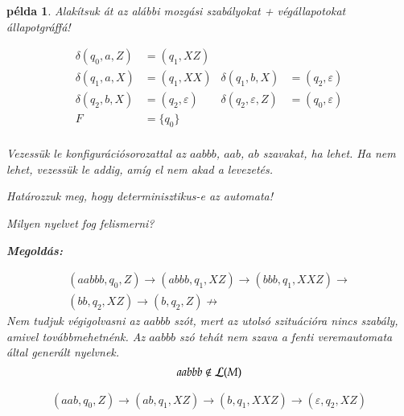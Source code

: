 \documentclass[a4paper]{article}
\newtheorem{pelda}{példa}[section]
\begin{document}
\begin{pelda}
Alakítsuk át az alábbi mozgási szabályokat + végállapotokat állapotgráffá!

\begin{align*}
\delta(q_0, a, Z) &= (q_1, XZ)\\
\delta(q_1, a, X) &= (q_1, XX)&
\delta(q_1, b, X) &= (q_2, \varepsilon)\\
\delta(q_2, b, X) &= (q_2, \varepsilon)&
\delta(q_2, \varepsilon, Z) &= (q_0, \varepsilon)\\
F &= \{q_0\}&&\\
\end{align*}

Vezessük le konfigurációsorozattal az $aabbb$, 
$aab$, $ab$ szavakat, ha lehet. Ha nem lehet, vezessük le addig, amíg el
nem akad a levezetés.

Határozzuk meg, hogy determinisztikus-e az automata!

Milyen nyelvet fog felismerni?

\textbf{Megoldás:}


\begin{gather*}
(aabbb, q_0, Z) \to (abbb,q_1,XZ) \to (bbb,q_1,XXZ)\to\\
(bb,q_2,XZ) \to (b,q_2,Z) \not \to
\end{gather*}
Nem tudjuk végigolvasni az $aabbb$ szót, mert az utolsó szituációra nincs
szabály, amivel továbbmehetnénk. Az $aabbb$ szó tehát nem szava a fenti
veremautomata által generált nyelvnek.
\[aabbb \notin {\cal L} (M)\]

\begin{gather*}
(aab, q_0, Z) \to (ab,q_1,XZ) \to (b,q_1,XXZ)\to
(\varepsilon,q_2,XZ)
\end{gather*}


\end{pelda}
\end{document}
